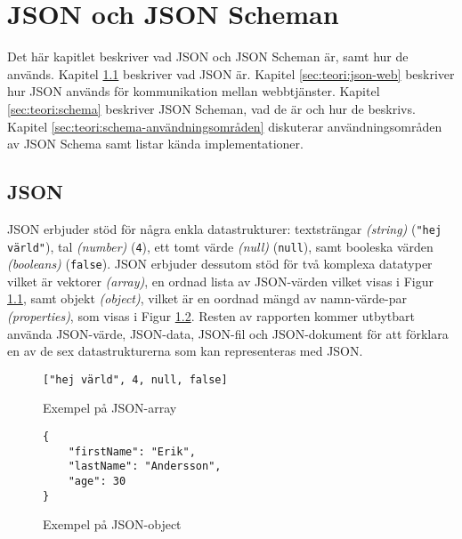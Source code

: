 \chapter{JSON och JSON Scheman}
\label{sec:teori}
Det här kapitlet beskriver vad JSON och JSON Scheman är, samt hur de används. Kapitel \ref{sec:teori:json} beskriver vad JSON är. Kapitel \ref{sec:teori:json-web} beskriver hur JSON används för kommunikation mellan webbtjänster. Kapitel \ref{sec:teori:schema} beskriver JSON Scheman, vad de är och hur de beskrivs. Kapitel \ref{sec:teori:schema-användningsområden} diskuterar användningsområden av JSON Schema samt listar kända implementationer.

\section{JSON}
\label{sec:teori:json}
JSON erbjuder stöd för några enkla datastrukturer: textsträngar \textit{(string)} (\texttt{"hej värld"}), tal \textit{(number)} (\texttt{4}), ett tomt värde \textit{(null)} (\texttt{null}), samt booleska värden \textit{(booleans)} (\texttt{false}). JSON erbjuder dessutom stöd för två komplexa datatyper vilket är vektorer \textit{(array)}, en ordnad lista av JSON-värden vilket visas i Figur \ref{fig:json-array-example}, samt objekt \textit{(object)}, vilket är en oordnad mängd av namn-värde-par \textit{(properties)}, som visas i Figur \ref{fig:json-object-example}. Resten av rapporten kommer utbytbart använda JSON-värde, JSON-data, JSON-fil och JSON-dokument för att förklara en av de sex datastrukturerna som kan representeras med JSON.

\begin{figure}
	\begin{verbatim}
["hej värld", 4, null, false]
	\end{verbatim}
	\vspace{-1.7em}
	\caption{Exempel på JSON-array}
	\label{fig:json-array-example}
\end{figure}

\begin{figure}
	\begin{verbatim}
{
	"firstName": "Erik",
	"lastName": "Andersson",
	"age": 30
}
	\end{verbatim}
	\vspace{-1.7em}
	\caption{Exempel på JSON-object}
	\label{fig:json-object-example}
\end{figure}

